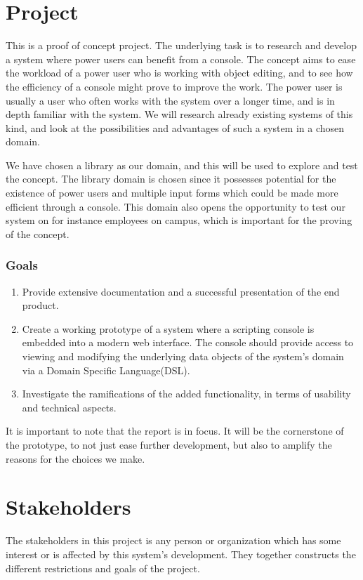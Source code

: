\section{Project}
This is a proof of concept project. The underlying task is to research and develop a system where power users can benefit from a console.  The concept aims to ease the workload of a power user who is working with object editing, and to see how the efficiency of a console might prove to improve the work. The power user is usually a user who often works with the system over a longer time, and is in depth familiar with the system. We will research already existing systems of this kind, and look at the possibilities and advantages of such a system in a chosen domain.

We have chosen a library as our domain, and this will be used to explore and test the concept. The library domain is chosen since it possesses potential for the existence of power users and multiple input forms which could be made more efficient through a console. This domain also opens the opportunity to test our system on for instance employees on campus, which is important for the proving of the concept.
\subsubsection{Goals}
\begin{enumerate}
  \item Provide extensive documentation and a successful presentation of the end product.
  \item Create a working prototype of a system where a scripting console is embedded into a modern web interface. The console should provide access to viewing and modifying the underlying data objects of the system's domain via a Domain Specific Language(DSL).
  \item Investigate the ramifications of the added functionality, in terms of usability and technical aspects.
\end{enumerate}

It is important to note that the report is in focus. It will be the cornerstone of the prototype, to not just ease further development, but also to amplify the reasons for the choices we make.

\section{Stakeholders}
The stakeholders in this project is any person or organization which has some interest or is affected by this system's development. They together constructs the different restrictions and goals of the project.

